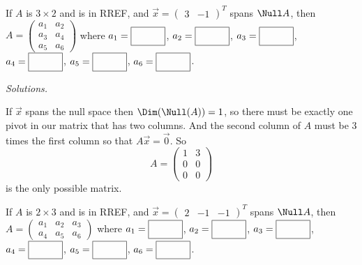 \ifnum {}
    If $A$ is $3 \times 2$ and is in RREF, and $\vec x = \begin{pmatrix} 3&-1\end{pmatrix}^T$ spans $\Null A$, then $A=\begin{pmatrix} a_1 & a_2 \\ a_3 & a_4 \\ a_5 & a_6 \end{pmatrix} $ where 
    $a_1 = \framebox{\strut\hspace{1.0cm}}$, 
    $a_2 = \framebox{\strut\hspace{1.0cm}}$, 
    $a_3 = \framebox{\strut\hspace{1.0cm}}$, 
    $a_4 = \framebox{\strut\hspace{1.0cm}}$,
    $a_5 = \framebox{\strut\hspace{1.0cm}}$,
    $a_6 = \framebox{\strut\hspace{1.0cm}}$.

    \ifnum {} {\color{DarkBlue} \textit{Solutions.} 

    If $\vec x$ spans the null space then $\Dim(\Null(A))=1$, so there must be exactly one pivot in our matrix that has two columns. And the second column of $A$ must be 3 times the first column so that $A\vec x = \vec 0$. So $$A = \begin{pmatrix} 1&3\\0&0\\0&0\end{pmatrix}$$ is the only possible matrix. 
    } 
   \else
   \fi
\fi     



\ifnum {}
    If $A$ is $2 \times 3$ and is in RREF, and $\vec x = \begin{pmatrix} 2&-1&-1\end{pmatrix}^T$ spans $\Null A$, then $A=\begin{pmatrix} a_1 & a_2 & a_3 \\ a_4 & a_5 & a_6 \end{pmatrix} $ where 
    $a_1 = \framebox{\strut\hspace{1.0cm}}$, 
    $a_2 = \framebox{\strut\hspace{1.0cm}}$, 
    $a_3 = \framebox{\strut\hspace{1.0cm}}$, 
    $a_4 = \framebox{\strut\hspace{1.0cm}}$,
    $a_5 = \framebox{\strut\hspace{1.0cm}}$,
    $a_6 = \framebox{\strut\hspace{1.0cm}}$.

